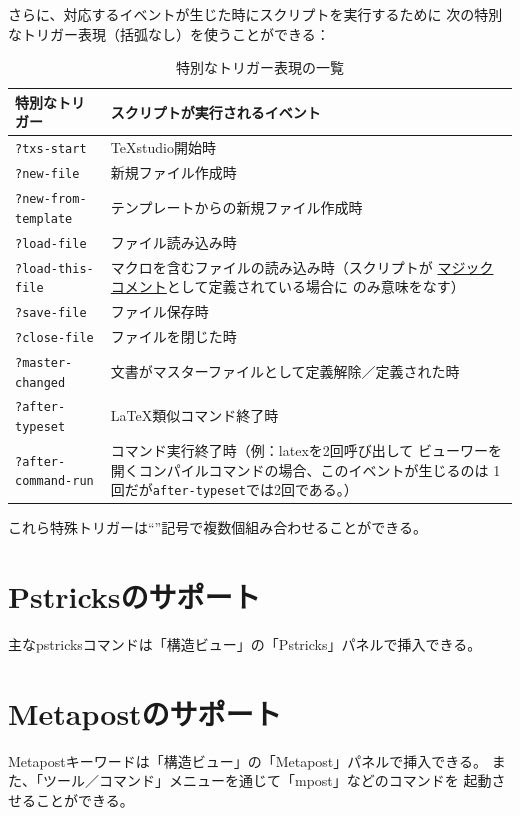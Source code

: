 さらに、対応するイベントが生じた時にスクリプトを実行するために
次の特別なトリガー表現（括弧なし）を使うことができる：

\begin{table}[H]
  \centering
  \caption{特別なトリガー表現の一覧}
  \begin{tabularx}{\linewidth}{lX}
    \hline
    \textbf{特別なトリガー} & \textbf{スクリプトが実行されるイベント}\\
    \hline
    \texttt{?txs-start} & TeXstudio開始時\\
    \texttt{?new-file} & 新規ファイル作成時\\
    \texttt{?new-from-template} & テンプレートからの新規ファイル作成時\\
    \texttt{?load-file} & ファイル読み込み時\\
    \texttt{?load-this-file}
      & マクロを含むファイルの読み込み時（スクリプトが
      \hyperref[sec:magiccomment]{マジックコメント}として定義されている場合に
      のみ意味をなす）\\
    \texttt{?save-file} & ファイル保存時\\
    \texttt{?close-file} & ファイルを閉じた時\\
    \texttt{?master-changed} & 文書がマスターファイルとして定義解除／定義された時\\
    \texttt{?after-typeset} & LaTeX類似コマンド終了時\\
    \texttt{?after-command-run}
      & コマンド実行終了時（例：latexを2回呼び出して
      ビューワーを開くコンパイルコマンドの場合、このイベントが生じるのは
      1回だが\texttt{after-typeset}では2回である。）\\
    \hline
  \end{tabularx}
\end{table}

これら特殊トリガーは``\textbar{}''記号で複数個組み合わせることができる。

\section{Pstricksのサポート}

主なpstricksコマンドは「構造ビュー」の「Pstricks」パネルで挿入できる。

\section{Metapostのサポート}

Metapostキーワードは「構造ビュー」の「Metapost」パネルで挿入できる。
また、「ツール／コマンド」メニューを通じて「mpost」などのコマンドを
起動させることができる。

